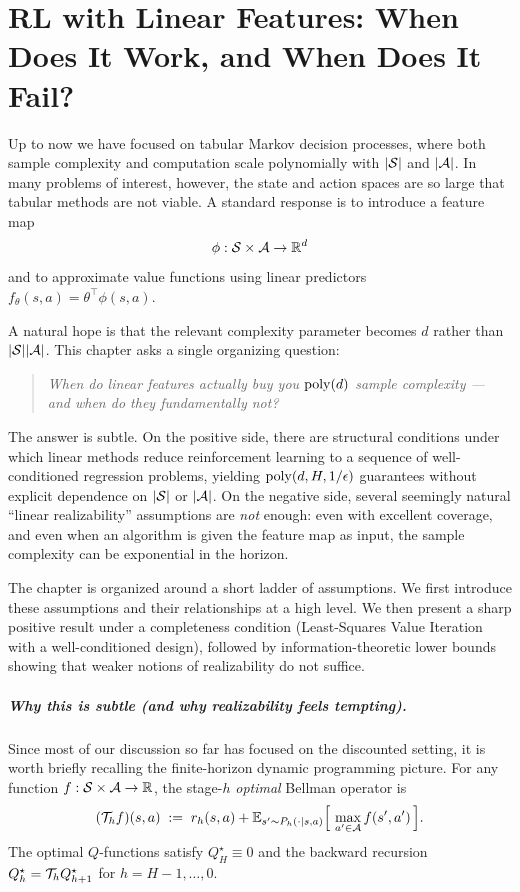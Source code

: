 \chapter{RL with Linear Features: When Does It Work, and When Does It Fail?}
\label{chap:linear_features}

Up to now we have focused on tabular Markov decision processes, where both
sample complexity and computation scale polynomially with $|\mathcal{S}|$ and $|\mathcal{A}|$.
In many problems of interest, however, the state and action spaces are so large
that tabular methods are not viable. A standard response is to introduce a
feature map
\[
\phi:\mathcal{S}\times\mathcal{A} \to \mathbb{R}^d
\]
and to approximate value functions using linear predictors
$f_\theta(s,a) = \theta^\top \phi(s,a)$.

A natural hope is that the relevant complexity parameter becomes $d$
rather than $|\mathcal{S}||\mathcal{A}|$.
This chapter asks a single organizing question:

\begin{quote}
\emph{When do linear features actually buy you $\mathrm{poly}(d)$ sample
  complexity --- and when do they fundamentally not?} 
\end{quote}

The answer is subtle.
On the positive side, there are structural conditions under which linear methods
reduce reinforcement learning to a sequence of well-conditioned regression
problems, yielding $\mathrm{poly}(d,H,1/\epsilon)$ guarantees without explicit dependence on
$|\mathcal{S}|$ or $|\mathcal{A}|$.
On the negative side, several seemingly natural ``linear realizability''
assumptions are \emph{not} enough: even with excellent coverage, and even when
an algorithm is given the feature map as input, the sample complexity can be
exponential in the horizon.

The chapter is organized around a short ladder of assumptions.
We first introduce these assumptions and their relationships at a high level.
We then present a sharp positive result under a completeness condition
(Least-Squares Value Iteration with a well-conditioned design), followed by
information-theoretic lower bounds showing that weaker notions of realizability
do not suffice.

\paragraph{Why this is subtle (and why realizability feels tempting).}
Since most of our discussion so far has focused on the discounted setting, it is
worth briefly recalling the finite-horizon dynamic programming picture.
For any function $f:\mathcal{S}\times\mathcal{A}\to\mathbb{R}$, the stage-$h$ \emph{optimal} Bellman
operator is
\[
(\mathcal{T}_h f)(s,a)
\;:=\;
r_h(s,a) + \mathbb{E}_{s'\sim P_h(\cdot\mid s,a)}\Big[\,\max_{a'\in\mathcal{A}} f(s',a')\,\Big].
\]
The optimal $Q$-functions satisfy $Q^\star_H \equiv 0$ and the backward recursion
$Q^\star_h = \mathcal{T}_h Q^\star_{h+1}$ for $h=H-1,\dots,0$.

